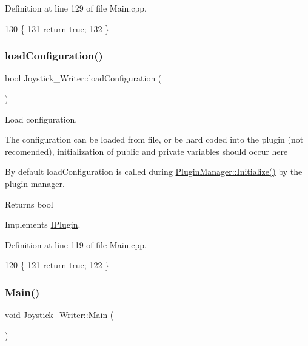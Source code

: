 Definition at line 129 of file Main.\+cpp.


\begin{DoxyCode}
130 \{
131     \textcolor{keywordflow}{return} \textcolor{keyword}{true};
132 \}
\end{DoxyCode}
\mbox{\label{class_joystick___writer_a8c8c94397bbbb2058685ad6e0f92b4b1}} 
\subsubsection{\texorpdfstring{load\+Configuration()}{loadConfiguration()}}
{\footnotesize\ttfamily bool Joystick\+\_\+\+Writer\+::load\+Configuration (\begin{DoxyParamCaption}{ }\end{DoxyParamCaption})\hspace{0.3cm}{\ttfamily [virtual]}}



Load configuration. 

The configuration can be loaded from file, or be hard coded into the plugin (not recomended), initialization of public and private variables should occur here

By default load\+Configuration is called during \hyperlink{class_plugin_manager_a956e653b7db36da9d034b4a93c8308d5}{Plugin\+Manager\+::\+Initialize()} by the plugin manager.

\begin{DoxyReturn}{Returns}
bool 
\end{DoxyReturn}


Implements \hyperlink{class_i_plugin_a418cff309436d3a15d9a4ce7369db6dd}{I\+Plugin}.



Definition at line 119 of file Main.\+cpp.


\begin{DoxyCode}
120 \{
121     \textcolor{keywordflow}{return} \textcolor{keyword}{true};
122 \}
\end{DoxyCode}
\mbox{\label{class_joystick___writer_aeb9c03f2389a5ed060b9c2a46fb84316}} 
\subsubsection{\texorpdfstring{Main()}{Main()}}
{\footnotesize\ttfamily void Joystick\+\_\+\+Writer\+::\+Main (\begin{DoxyParamCaption}{ }\end{DoxyParamCaption})\hspace{0.3cm}{\ttfamily [virtual]}}



